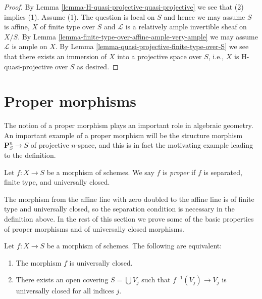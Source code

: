 \begin{proof}
By Lemma \ref{lemma-H-quasi-projective-quasi-projective}
we see that (2) implies (1). Assume (1).
The question is local on $S$ and hence we may assume $S$ is affine,
$X$ of finite type over $S$ and
$\mathcal{L}$ is a relatively ample invertible sheaf on $X/S$.
By Lemma \ref{lemma-finite-type-over-affine-ample-very-ample}
we may assume $\mathcal{L}$ is ample on $X$.
By Lemma \ref{lemma-quasi-projective-finite-type-over-S} we see that there
exists an immersion of $X$ into
a projective space over $S$, i.e., $X$ is H-quasi-projective over $S$
as desired.
\end{proof}





\section{Proper morphisms}
\label{section-proper}

\noindent
The notion of a proper morphism plays an important role in algebraic
geometry. An important example of a proper morphism will be the
structure morphism $\mathbf{P}^n_S \to S$ of projective $n$-space,
and this is in fact the motivating example leading to the definition.

\begin{definition}
\label{definition-proper}
Let $f : X \to S$ be a morphism of schemes.
We say $f$ is {\it proper} if $f$ is separated, finite type, and
universally closed.
\end{definition}

\noindent
The morphism from the affine line with zero doubled to the affine line
is of finite type and universally closed, so the separation condition is
necessary in the definition above.
In the rest of this section we prove some of the basic properties
of proper morphisms and of universally closed morphisms.

\begin{lemma}
\label{lemma-universally-closed-local-on-the-base}
Let $f : X \to S$ be a morphism of schemes.
The following are equivalent:
\begin{enumerate}
\item The morphism $f$ is universally closed.
\item There exists an open covering $S = \bigcup V_j$ such
that $f^{-1}(V_j) \to V_j$ is universally closed for all indices $j$.
\end{enumerate}
\end{lemma}

